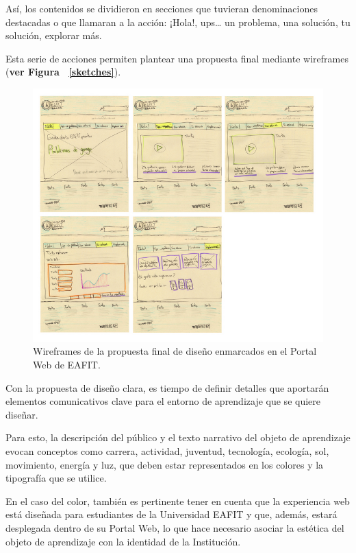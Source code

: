 \documentclass[twoside,letterpaper,11pt]{report}
\begin{document}
Así, los contenidos se dividieron en secciones que tuvieran denominaciones destacadas o que llamaran a la acción: ¡Hola!, ups… un problema, una solución, tu solución, explorar más.

Esta serie de acciones permiten plantear una propuesta final mediante wireframes (\textbf{ver Figura ~\ref{sketches}}).

\begin{figure}[h!]
\label{wireframes}
\includegraphics[width=1\textwidth]{aux/wireframes}
\caption{Wireframes de la propuesta final de diseño enmarcados en el Portal Web de EAFIT.}
\end{figure}


Con la propuesta de diseño clara, es tiempo de definir detalles que aportarán elementos comunicativos clave para el entorno de aprendizaje que se quiere diseñar.

Para esto, la descripción del público y el texto narrativo del objeto de aprendizaje evocan conceptos como carrera, actividad, juventud, tecnología, ecología, sol, movimiento, energía y luz, que deben estar representados en los colores y la tipografía que se utilice.

En el caso del color, también es pertinente tener en cuenta que la experiencia web está diseñada para estudiantes de la Universidad EAFIT y que, además, estará desplegada dentro de su Portal Web, lo que hace necesario asociar la estética del objeto de aprendizaje con la identidad de la Institución.
\end{document}
